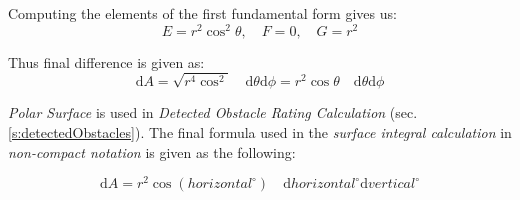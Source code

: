 \noindent Computing the elements of the first fundamental form gives us:
\begin{equation}
    E = r^2\cos^2\theta,\quad F=0,\quad G=r^2
\end{equation}

\noindent Thus final difference is given as:
\begin{equation}\label{eq:finalCellSquareNice}
    \text{d}A=\sqrt{r^4\cos^2}\quad \text{d}\theta\text{d}\phi = r^2 \cos\theta\quad \text{d}\theta\text{d}\phi
\end{equation}

\begin{note} 
    \emph{Polar Surface} is used in \emph{Detected Obstacle Rating Calculation} (sec. \ref{s:detectedObstacles}). The final formula used in the \emph{surface integral calculation} in \emph{non-compact notation} is given as the following:

    \begin{equation}\label{eq:finalCellSquare}
        \text{d}A= r^2 \cos(horizontal^\circ)\quad \text{d}horizontal^\circ \text{d}vertical^\circ
    \end{equation}
\end{note}